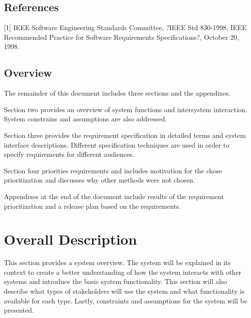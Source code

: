 \documentclass[compsoc,draftclsnofoot,onecolumn,10pt]{IEEEtran}
\begin{document}
\subsection{References} %
[1] IEEE Software Engineering Standards Committee, ?IEEE Std 830-1998, IEEE 
Recommended Practice for Software Requirements Specifications?, October 20, 1998.

\subsection{Overview} %
The remainder of this document includes three sections and the appendixes. \par
Section two provides an overview of system functions and intersystem interaction. 
System constrains and assumptions are also addressed. \par
Section three provides the requirement specification in detailed terms and system 
interface descriptions. Different specification techniques are used in order to specify 
requirements for different audiences. \par
Section four priorities requirements and includes motivation for the chose prioritization 
and discusses why other methods were not chosen. \par
Appendixes at the end of the document include results of the requirement prioritization 
and a release plan based on the requirements.

\section{Overall Description} %
This section provides a system overview. The system will be explained in its context to 
create a better understanding of how the system interacts with other systems and 
introduce the basic system functionality. This section will also describe what types of 
stakeholders will use the system and what functionality is available for each type. 
Lastly, constraints and assumptions for the system will be presented. 

\end{document}
